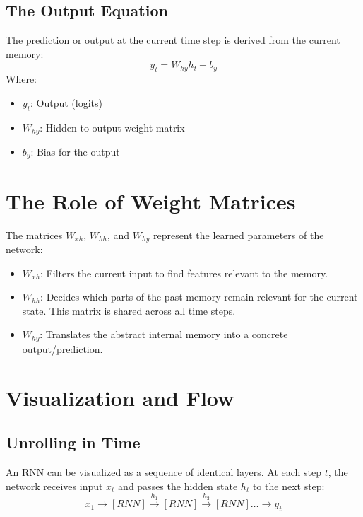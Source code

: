 \documentclass{article}
\begin{document}
\subsection{The Output Equation}
The prediction or output at the current time step is derived from the current memory:
\begin{equation}
y_t = W_{hy} h_t + b_y
\end{equation}
Where:
\begin{itemize}
    \item $y_t$: Output (logits)
    \item $W_{hy}$: Hidden-to-output weight matrix
    \item $b_y$: Bias for the output
\end{itemize}

\section{The Role of Weight Matrices}
The matrices $W_{xh}$, $W_{hh}$, and $W_{hy}$ represent the learned parameters of the network:
\begin{itemize}
    \item \textbf{$W_{xh}$}: Filters the current input to find features relevant to the memory.
    \item \textbf{$W_{hh}$}: Decides which parts of the past memory remain relevant for the current state. This matrix is shared across all time steps.
    \item \textbf{$W_{hy}$}: Translates the abstract internal memory into a concrete output/prediction.
\end{itemize}

\section{Visualization and Flow}
\subsection{Unrolling in Time}
An RNN can be visualized as a sequence of identical layers. At each step $t$, the network receives input $x_t$ and passes the hidden state $h_t$ to the next step:
\[ x_1 \rightarrow [RNN] \xrightarrow{h_1} [RNN] \xrightarrow{h_2} [RNN] \dots \rightarrow y_t \]
\end{document}
